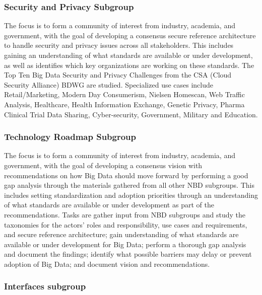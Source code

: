 \subsubsection{Security and Privacy
Subgroup}\label{security-and-privacy-subgroup}

The focus is to form a community of interest from industry, academia,
and government, with the goal of developing a consensus secure reference
architecture to handle security and privacy issues across all
stakeholders. This includes gaining an understanding of what standards
are available or under development, as well as identifies which key
organizations are working on these standards. The Top Ten Big Data
Security and Privacy Challenges from the CSA (Cloud Security Alliance)
BDWG are studied. Specialized use cases include Retail/Marketing, Modern
Day Consumerism, Nielsen Homescan, Web Traffic Analysis, Healthcare,
Health Information Exchange, Genetic Privacy, Pharma Clinical Trial Data
Sharing, Cyber-security, Government, Military and Education.




\subsubsection{Technology Roadmap
Subgroup}\label{technology-roadmap-subgroup}

The focus is to form a community of interest from industry, academia,
and government, with the goal of developing a consensus vision with
recommendations on how Big Data should move forward by performing a good
gap analysis through the materials gathered from all other NBD
subgroups. This includes setting standardization and adoption priorities
through an understanding of what standards are available or under
development as part of the recommendations. Tasks are gather input from
NBD subgroups and study the taxonomies for the actors' roles and
responsibility, use cases and requirements, and secure reference
architecture; gain understanding of what standards are available or
under development for Big Data; perform a thorough gap analysis and
document the findings; identify what possible barriers may delay or
prevent adoption of Big Data; and document vision and recommendations.




\subsubsection{Interfaces subgroup}\label{interfaces-subgroup}

